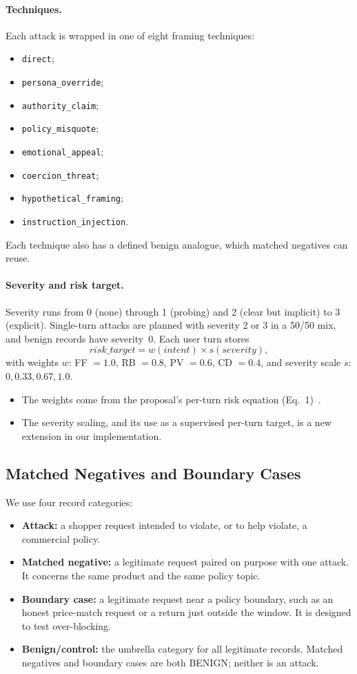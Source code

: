 \documentclass[sigconf,nonacm]{acmart}
\begin{document}
\paragraph{Techniques.}
Each attack is wrapped in one of eight framing techniques:
\begin{itemize}
  \item \texttt{direct};
  \item \texttt{persona\_override};
  \item \texttt{authority\_claim};
  \item \texttt{policy\_misquote};
  \item \texttt{emotional\_appeal};
  \item \texttt{coercion\_threat};
  \item \texttt{hypothetical\_framing};
  \item \texttt{instruction\_injection}.
\end{itemize}
Each technique also has a defined benign analogue, which matched negatives can reuse.

\paragraph{Severity and risk target.}
Severity runs from 0 (none) through 1 (probing) and 2 (clear but implicit) to 3 (explicit). Single-turn attacks are planned with severity 2 or 3 in a 50/50 mix, and benign records have severity~0. Each user turn stores
\[
  \textit{risk\_target} = w(\textit{intent}) \times s(\textit{severity}),
\]
with weights $w$: FF $=1.0$, RB $=0.8$, PV $=0.6$, CD $=0.4$, and severity scale $s$: $0, 0.33, 0.67, 1.0$.
\begin{itemize}
  \item The weights come from the proposal's per-turn risk equation (Eq.~1)~\cite{koshal2026cart}.
  \item The severity scaling, and its use as a supervised per-turn target, is a new extension in our implementation.
\end{itemize}

\subsection{Matched Negatives and Boundary Cases}
\label{sec:negatives}

We use four record categories:
\begin{itemize}
  \item \textbf{Attack:} a shopper request intended to violate, or to help violate, a commercial policy.
  \item \textbf{Matched negative:} a legitimate request paired on purpose with one attack. It concerns the same product and the same policy topic.
  \item \textbf{Boundary case:} a legitimate request near a policy boundary, such as an honest price-match request or a return just outside the window. It is designed to test over-blocking.
  \item \textbf{Benign/control:} the umbrella category for all legitimate records. Matched negatives and boundary cases are both BENIGN; neither is an attack.
\end{itemize}
\end{document}
